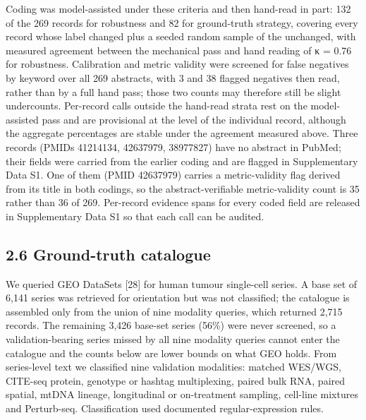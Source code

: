 \documentclass[11pt]{article}
\begin{document}
Coding was model-assisted under these criteria and then hand-read in
part: 132 of the 269 records for robustness and 82 for ground-truth
strategy, covering every record whose label changed plus a seeded random
sample of the unchanged, with measured agreement between the mechanical
pass and hand reading of κ = 0.76 for robustness. Calibration and metric
validity were screened for false negatives by keyword over all 269
abstracts, with 3 and 38 flagged negatives then read, rather than by a
full hand pass; those two counts may therefore still be slight
undercounts. Per-record calls outside the hand-read strata rest on the
model-assisted pass and are provisional at the level of the individual
record, although the aggregate percentages are stable under the
agreement measured above. Three records (PMIDs 41214134, 42637979,
38977827) have no abstract in PubMed; their fields were carried from the
earlier coding and are flagged in Supplementary Data S1. One of them
(PMID 42637979) carries a metric-validity flag derived from its title in
both codings, so the abstract-verifiable metric-validity count is 35
rather than 36 of 269. Per-record evidence spans for every coded field
are released in Supplementary Data S1 so that each call can be audited.

\subsection{2.6 Ground-truth catalogue}\label{ground-truth-catalogue}

We queried GEO DataSets {[}28{]} for human tumour single-cell series. A
base set of 6,141 series was retrieved for orientation but was not
classified; the catalogue is assembled only from the union of nine
modality queries, which returned 2,715 records. The remaining 3,426
base-set series (56\%) were never screened, so a validation-bearing
series missed by all nine modality queries cannot enter the catalogue
and the counts below are lower bounds on what GEO holds. From
series-level text we classified nine validation modalities: matched
WES/WGS, CITE-seq protein, genotype or hashtag multiplexing, paired bulk
RNA, paired spatial, mtDNA lineage, longitudinal or on-treatment
sampling, cell-line mixtures and Perturb-seq. Classification used
documented regular-expression rules.
\end{document}
